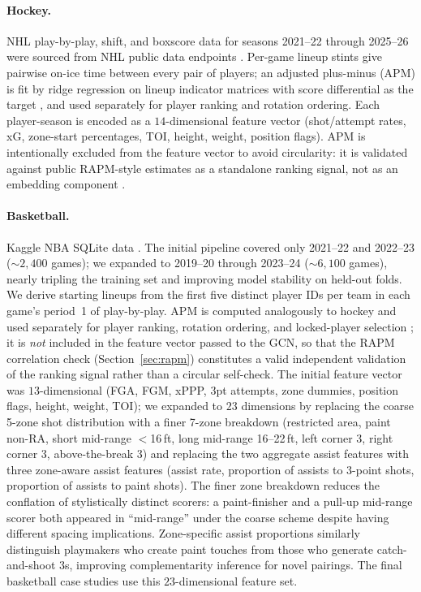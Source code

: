 \documentclass[11pt,letterpaper]{article}
\begin{document}
\paragraph{Hockey.} NHL play-by-play, shift, and boxscore data for
seasons 2021--22 through 2025--26 were sourced from NHL public data
endpoints \citep{nhlPublicApi}. Per-game lineup stints give pairwise
on-ice time between every pair of players; an adjusted plus-minus (APM)
is fit by ridge regression on lineup indicator matrices with score
differential as the target \citep{hoerl1970ridge,macdonald2011nhl}, and
used separately for player ranking and rotation ordering. Each
player-season is encoded as a
$14$-dimensional feature vector (shot/attempt rates, xG, zone-start
percentages, TOI, height, weight, position flags). APM is intentionally
excluded from the feature vector to avoid circularity: it is validated
against public RAPM-style estimates as a standalone ranking signal, not
as an embedding component \citep{sill2010rapm,ghimire2020rapm}.

\paragraph{Basketball.} Kaggle NBA SQLite data
\citep{walshBasketball,walshNbadb}.
The initial pipeline covered only 2021--22 and 2022--23 ($\sim 2{,}400$
games); we expanded to 2019--20 through 2023--24 ($\sim 6{,}100$ games),
nearly tripling the training set and improving model stability on
held-out folds. We derive starting lineups from the first five distinct
player IDs per team in each game's period~1 of play-by-play. APM is
computed analogously to hockey and used separately for player ranking,
rotation ordering, and locked-player selection
\citep{sill2010rapm,ghimire2020rapm}; it is \emph{not} included in the
feature vector passed to the GCN, so that the RAPM correlation check
(Section~\ref{sec:rapm}) constitutes a valid
independent validation of the ranking signal rather than a circular
self-check. The initial feature vector was $13$-dimensional (FGA, FGM,
xPPP, 3pt attempts, zone dummies, position flags, height, weight, TOI);
we expanded to $23$ dimensions by replacing the coarse 5-zone shot
distribution with a finer 7-zone breakdown (restricted area, paint
non-RA, short mid-range $<$16\,ft, long mid-range 16--22\,ft, left
corner 3, right corner 3, above-the-break 3) and replacing the two
aggregate assist features with three zone-aware assist features (assist
rate, proportion of assists to 3-point shots, proportion of assists to
paint shots). The finer zone breakdown reduces the conflation of
stylistically distinct scorers: a paint-finisher and a pull-up
mid-range scorer both appeared in ``mid-range'' under the coarse scheme
despite having different spacing implications. Zone-specific assist
proportions similarly distinguish playmakers who create paint touches
from those who generate catch-and-shoot 3s, improving complementarity
inference for novel pairings.
The final basketball case studies use this $23$-dimensional feature
set.
\end{document}

